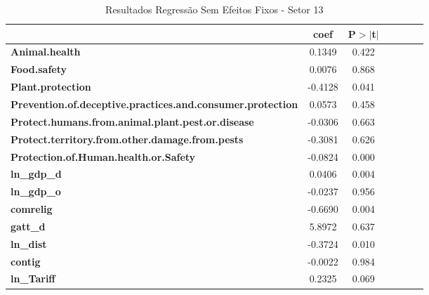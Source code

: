 \begin{table}[ht]
    \begin{center}
        \begin{tabular}{lcccccc}
                                                                   & \textbf{coef} & \textbf{P$> |$t$|$}\\
\midrule
\textbf{Animal.health}                                             &       0.1349  &         0.422       \\
\textbf{Food.safety}                                               &       0.0076  &         0.868       \\
\textbf{Plant.protection}                                          &      -0.4128  &         0.041       \\
\textbf{Prevention.of.deceptive.practices.and.consumer.protection} &       0.0573  &         0.458       \\
\textbf{Protect.humans.from.animal.plant.pest.or.disease}          &      -0.0306  &         0.663       \\
\textbf{Protect.territory.from.other.damage.from.pests}            &      -0.3081  &         0.626       \\
\textbf{Protection.of.Human.health.or.Safety}                      &      -0.0824  &         0.000       \\
\textbf{ln\_gdp\_d}                                                &       0.0406  &         0.004       \\
\textbf{ln\_gdp\_o}                                                &      -0.0237  &         0.956       \\
\textbf{comrelig}                                                  &      -0.6690  &         0.004       \\
\textbf{gatt\_d}                                                   &       5.8972  &         0.637       \\
\textbf{ln\_dist}                                                  &      -0.3724  &         0.010       \\
\textbf{contig}                                                    &      -0.0022  &         0.984       \\
\textbf{ln\_Tariff}                                                &       0.2325  &         0.069       \\
\bottomrule
\end{tabular}
\caption{Resultados Regressão Sem Efeitos Fixos - Setor 13}
\end{center}
\end{table}
